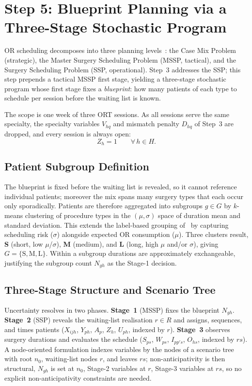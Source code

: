 \section{Step 5: Blueprint Planning via a Three-Stage Stochastic Program}

OR scheduling decomposes into three planning levels~\cite{samudra2016}: the Case
Mix Problem (strategic), the Master Surgery Scheduling Problem (MSSP, tactical),
and the Surgery Scheduling Problem (SSP, operational). Step~3 addresses the SSP;
this step prepends a tactical MSSP first stage, yielding a three-stage
stochastic program whose first stage fixes a \emph{blueprint}: how many patients
of each type to schedule per session before the waiting list is known.

The scope is one week of three ORT sessions. As all sessions serve the same
specialty, the specialty variables $V_{hq}$ and mismatch penalty $D_{hq}$ of
Step~3 are dropped, and every session is always open:
\begin{equation}
  Z_h = 1 \qquad \forall\, h \in H.
  \label{eq:allopen}
\end{equation}

\subsection{Patient Subgroup Definition}
\label{sec:clustering}
The blueprint is fixed before the waiting list is revealed, so it cannot
reference individual patients; moreover the mix spans many surgery types that
each occur only sporadically. Patients are therefore aggregated into subgroups
$g \in G$ by $k$-means clustering of procedure types in the $(\mu, \sigma)$ space
of duration mean and standard deviation. This extends the label-based grouping
of~\cite{sheweita2021} by capturing scheduling risk ($\sigma$)
alongside expected OR consumption ($\mu$). Three clusters result, \textbf{S}
(short, low $\mu$/$\sigma$), \textbf{M} (medium), and \textbf{L} (long, high
$\mu$ and/or $\sigma$), giving $G = \{\mathrm{S}, \mathrm{M}, \mathrm{L}\}$.
Within a subgroup durations are approximately exchangeable, justifying the
subgroup count $N_{gh}$ as the Stage-1 decision.

\subsection{Three-Stage Structure and Scenario Tree}
\label{sec:three_stage_structure}
Uncertainty resolves in two phases. \textbf{Stage~1} (MSSP) fixes the blueprint
$N_{gh}$. \textbf{Stage~2} (SSP) reveals the waiting-list realisation $r \in R$
and assigns, sequences, and times patients ($X_{ijh}$, $Y_{ph}$, $A_p$, $Z_h$,
$U_{ph}$, indexed by $r$). \textbf{Stage~3} observes surgery durations and
evaluates the schedule ($S_{ps}$, $W_{ps}$, $I_{pp's}$, $O_{hs}$, indexed by
$rs$). A node-oriented formulation indexes variables by the nodes of a scenario
tree with root $n_0$, waiting-list nodes $r$, and leaves $rs$; non-anticipativity
is then structural, $N_{gh}$ is set at $n_0$, Stage-2 variables at $r$, Stage-3
variables at $rs$, so no explicit non-anticipativity constraints are needed.

